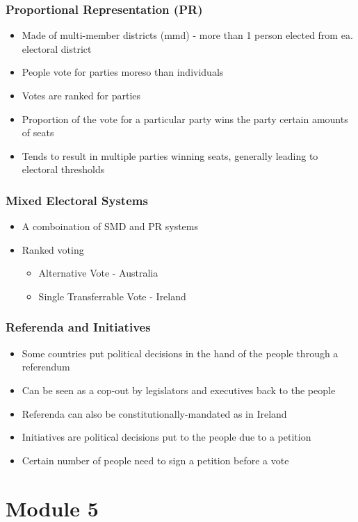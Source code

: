 \documentclass[11pt]{article}
\begin{document}
\subsubsection{Proportional Representation (PR)}
\label{sec:org04b6c8f}
\begin{itemize}
\item Made of multi-member districts (mmd) - more than 1 person elected from ea. electoral district
\item People vote for parties moreso than individuals
\item Votes are ranked for parties
\item Proportion of the vote for a particular party wins the party certain amounts of seats
\item Tends to result in multiple parties winning seats, generally leading to electoral thresholds
\end{itemize}
\subsubsection{Mixed Electoral Systems}
\label{sec:org01b7f70}
\begin{itemize}
\item A comboination of SMD and PR systems
\item Ranked voting
\begin{itemize}
\item Alternative Vote - Australia
\item Single Transferrable Vote - Ireland
\end{itemize}
\end{itemize}
\subsubsection{Referenda and Initiatives}
\label{sec:org6a0145d}
\begin{itemize}
\item Some countries put political decisions in the hand of the people through a referendum
\item Can be seen as a cop-out by legislators and executives back to the people
\item Referenda can also be constitutionally-mandated as in Ireland
\item Initiatives are political decisions put to the people due to a petition
\item Certain number of people need to sign a petition before a vote
\end{itemize}
\section{Module 5}
\label{sec:org623af18}
\end{document}
